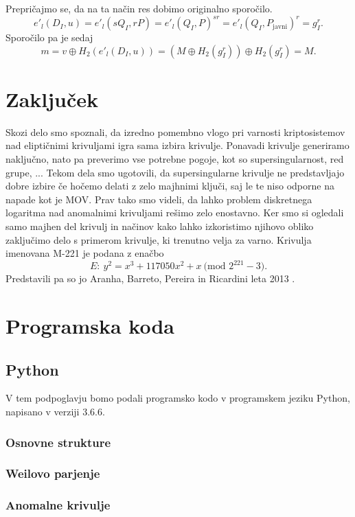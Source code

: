 \documentclass[12pt,a4paper,twoside]{article}
\theoremstyle{definition} %
\theoremstyle{plain} %
\numberwithin{equation}{section}  %
\newcommand{\MOD}[1]{\ \text{(mod }{#1}\text{)}}
\begin{document}
Prepričajmo se, da na ta način res dobimo originalno sporočilo.
$$e'_l(D_I,u) = e'_l(sQ_I,rP) = e'_l(Q_I,P)^{sr}= e'_l(Q_I,P_{\text{javni}})^r = g^r_I.$$
Sporočilo pa je sedaj
$$m = v \oplus H_2(e'_l(D_I,u)) = (M \oplus H_2(g^r_I)) \oplus H_2(g^r_I) = M.$$




\newpage

\section{Zaključek}

Skozi delo smo spoznali, da izredno pomembno vlogo pri varnosti kriptosistemov nad eliptičnimi krivuljami igra sama izbira krivulje. Ponavadi krivulje generiramo naključno, nato pa preverimo vse potrebne pogoje, kot so supersingularnost, red grupe, ... Tekom dela smo ugotovili, da supersingularne krivulje ne predstavljajo dobre izbire če hočemo delati z zelo majhnimi ključi, saj le te niso odporne na napade kot je MOV. Prav tako smo videli, da lahko problem diskretnega logaritma nad anomalnimi krivuljami rešimo zelo enostavno. Ker smo si ogledali samo majhen del krivulj in načinov kako lahko izkoristimo njihovo obliko zaključimo delo s primerom krivulje, ki trenutno velja za varno. Krivulja imenovana M-221 je podana z enačbo
$$E:\ y^2 = x^3+117050x^2+x \MOD{2^{221} - 3}.$$
Predstavili pa so jo Aranha, Barreto, Pereira in  Ricardini leta 2013 \cite{Aranha2013}.

\appendix

\section{Programska koda}
\subsection{Python}
V tem podpoglavju bomo podali programsko kodo v programskem jeziku Python, napisano v verziji $3.6.6$.
\subsubsection{Osnovne strukture}

\subsubsection{Weilovo parjenje}

\subsubsection{Anomalne krivulje}

\end{document}
